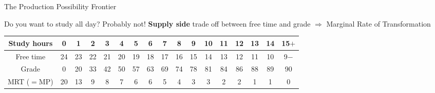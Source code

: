 \documentclass[11pt,aspectratio=43,usenames,dvipsnames]{beamer}
\theoremstyle{definition}
\begin{document}
\begin{frame}{The Production Possibility Frontier}
\label{slide:The_Production_Possibility_Frontier}

 { Do you want to study all day? Probably not! }
 { \small \textbf{Supply side} trade off between free time and grade $ \Rightarrow  $ M{\tiny arginal} R{\tiny ate of }T{\tiny ransformation}}

\begin{center}
\tiny
\begin{tabular}{c|c|c|c|c|c|c|c|c|c|c|c|c|c|c|c|c}
    Study hours  & 0  & 1  & 2  & 3  & 4  & 5  & 6  & 7  & 8  & 9  & 10  & 11  & 12  & 13  & 14  & 15$+$
    \\
    \hline
    Free time & 24  & 23  & 22  & 21  & 20  & 19  & 18  & 17  & 16  & 15  & 14  & 13  & 12  & 11  & 10  & 9$-$
    \\
    \hline
    Grade  & 0  & 20  & 33  & 42  & 50  & 57  & 63  & 69  & 74  & 78  & 81  & 84  & 86  & 88  & 89  & 90
    \\
    \hline
    MRT ($=$MP) & 20  & 13  & 9  & 8  & 7  & 6  & 6  & 5  & 4  & 3  & 3  & 2  & 2  & 1  &  1 & 0
    \\
\end{tabular}

\end{center}

\end{frame}
\end{document}
